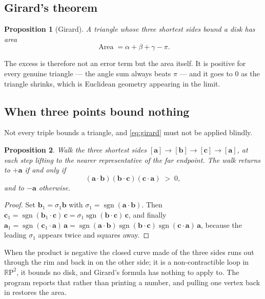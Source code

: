 \documentclass[11pt,a4paper]{article}
\newcommand{\RP}{\mathbb{R}\mathrm{P}}
\newcommand{\aaa}{\mathbf{a}}
\newcommand{\bb}{\mathbf{b}}
\newcommand{\cc}{\mathbf{c}}
\theoremstyle{plain}
\newtheorem{proposition}{Proposition}[section]
\theoremstyle{definition}
\theoremstyle{remark}
\begin{document}
\subsection{Girard's theorem}

\begin{proposition}[Girard]
A triangle whose three shortest sides bound a disk has area
\begin{equation}
  \label{eq:girard}
  \operatorname{Area}=\alpha+\beta+\gamma-\pi .
\end{equation}
\end{proposition}

The excess is therefore not an error term but the area itself. It is positive
for every genuine triangle --- the angle sum always beats $\pi$ --- and it goes
to $0$ as the triangle shrinks, which is Euclidean geometry appearing in the
limit.

\subsection{When three points bound nothing}

Not every triple bounds a triangle, and \eqref{eq:girard} must not be applied
blindly.

\begin{proposition}
\label{prop:bounds}
Walk the three shortest sides $[\aaa]\to[\bb]\to[\cc]\to[\aaa]$, at each step
lifting to the nearer representative of the far endpoint. The walk returns to
$+\aaa$ if and only if
\begin{equation}
  \label{eq:bounds}
  (\aaa\cdot\bb)(\bb\cdot\cc)(\cc\cdot\aaa)\;>\;0 ,
\end{equation}
and to $-\aaa$ otherwise.
\end{proposition}

\begin{proof}
Set $\bb_1=\sigma_1\bb$ with $\sigma_1=\operatorname{sgn}(\aaa\cdot\bb)$. Then
$\cc_1=\operatorname{sgn}(\bb_1\cdot\cc)\,\cc=\sigma_1\operatorname{sgn}(\bb\cdot\cc)\,\cc$,
and finally
$\aaa_1=\operatorname{sgn}(\cc_1\cdot\aaa)\,\aaa
      =\operatorname{sgn}(\aaa\cdot\bb)\operatorname{sgn}(\bb\cdot\cc)\operatorname{sgn}(\cc\cdot\aaa)\,\aaa$,
because the leading $\sigma_1$ appears twice and squares away.
\end{proof}

When the product is negative the closed curve made of the three sides runs out
through the rim and back in on the other side; it is a non-contractible loop in
$\RP^2$, it bounds no disk, and Girard's formula has nothing to apply to. The
program reports that rather than printing a number, and pulling one vertex back
in restores the area.
\end{document}
